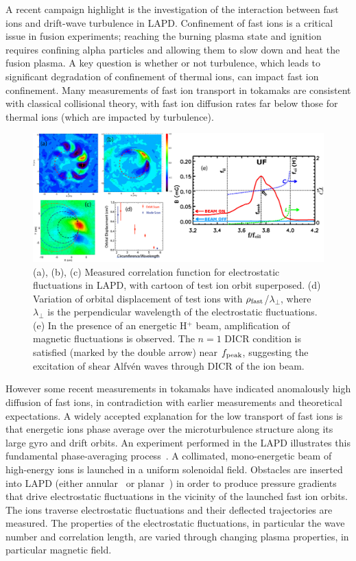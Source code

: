 \documentclass[11pt]{article}
\renewcommand{\cite}{\citep}
\begin{document}
A recent campaign highlight is the investigation of the interaction
between fast ions and drift-wave turbulence in LAPD.  Confinement of
fast ions is a critical issue in fusion experiments; reaching the
burning plasma state and ignition requires confining alpha particles
and allowing them to slow down and heat the fusion plasma.
 A key
question is whether or not turbulence, which leads to significant
degradation of confinement of thermal ions, can impact fast ion confinement.
Many measurements of fast ion transport in
tokamaks are consistent with classical collisional theory, with fast
ion diffusion rates far below those for thermal ions (which are
impacted by turbulence).  

\begin{figure}[!htbp]
\centerline{\includegraphics[width=6.0truein]{fastion2}}
\caption{\small (a), (b), (c) Measured correlation function for electrostatic
  fluctuations in LAPD, with cartoon of test ion orbit superposed. (d)
  Variation of orbital displacement of test ions with $\rho_{\rm
    fast}$/$\lambda_{\perp}$, where $\lambda_\perp$ is the
  perpendicular wavelength of the electrostatic fluctuations. (e) In the presence of an energetic H$^+$ beam, amplification of
  magnetic fluctuations is observed.  The $n = 1$ DICR
  condition is satisfied (marked by the double arrow) near $f_{\rm peak}$,
  suggesting the excitation of shear Alfv\'{e}n waves through DICR of the
  ion beam. }\label{fastion}
\end{figure}

However some recent measurements in tokamaks
have indicated anomalously high diffusion of fast ions, in
contradiction with earlier measurements and theoretical expectations.
A widely accepted explanation for the low transport of fast ions is that
energetic ions phase average over the microturbulence structure
along its large gyro and drift orbits.  An experiment performed in the
LAPD illustrates this fundamental
phase-averaging process~\cite{zhou:2010,zhou:2012a, zhou:2012b, heidbrink:2012}. A collimated, mono-energetic beam
of high-energy ions is launched in a uniform solenoidal field.
Obstacles are inserted into LAPD (either annular~\cite{zhou:2012a} or
planar~\cite{carter:2006}) in order to produce pressure gradients that drive
electrostatic fluctuations in the vicinity of the launched fast ion
orbits.  The ions traverse electrostatic fluctuations and their
deflected trajectories are measured.  The properties of the
electrostatic fluctuations, in particular the wave number and
correlation length, are varied through changing plasma properties, in
particular magnetic field.  
\end{document}
